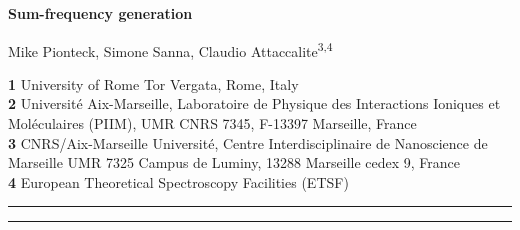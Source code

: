 \documentclass[submission, Phys]{SciPost}
\newcommand{\torvergata}{University of Rome Tor Vergata, Rome, Italy}
\newcommand{\piim}{Universit\'e Aix-Marseille, Laboratoire de Physique des Interactions Ioniques et Moléculaires (PIIM), UMR CNRS 7345, F-13397 Marseille, France}
\newcommand{\cinam}{CNRS/Aix-Marseille Universit\'e, Centre Interdisciplinaire de Nanoscience de Marseille UMR 7325 Campus de Luminy, 13288 Marseille cedex 9, France}
\newcommand{\etsf}{European Theoretical Spectroscopy Facilities (ETSF)}
\renewcommand{\[}{\left[}
\renewcommand{\]}{\right]}
\renewcommand{\(}{\left(}
\renewcommand{\)}{\right)}
\begin{document}

\begin{center}{\Large \textbf{Sum-frequency generation}}\end{center}

\begin{center}

Mike Pionteck, Simone Sanna, Claudio Attaccalite\textsuperscript{3,4}
\end{center}



\begin{center}
{\bf 1} \torvergata
\\
{\bf 2} \piim
\\
{\bf 3} \cinam
\\
{\bf 4} \etsf
\\
\end{center}

\date{\today}

\begin{abstract}

\end{abstract}

\vspace{10pt}
\noindent\rule{\textwidth}{1pt}
\tableofcontents\thispagestyle{fancy}
\noindent\rule{\textwidth}{1pt}
\vspace{10pt}
\end{document}

